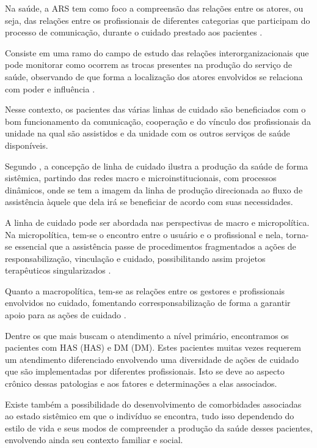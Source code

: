 Na saúde, a \acrlong{ARS} tem como foco a compreensão das relações entre os atores, ou seja, das relações entre os profissionais de diferentes categorias que participam do processo de comunicação, durante o cuidado prestado aos pacientes \cite{antonio2013}.
 
Consiste em uma ramo do campo de estudo das relações interorganizacionais que pode monitorar como ocorrem as trocas presentes na produção do serviço de saúde, observando de que forma a localização dos atores envolvidos se relaciona com poder e influência \cite{bittencourt2009rede}.

Nesse contexto, os pacientes das várias linhas de cuidado são beneficiados com o bom funcionamento da comunicação, cooperação e do vínculo dos profissionais da unidade na qual são assistidos e da unidade com os outros serviços de saúde disponíveis. 

Segundo , a concepção de linha de cuidado ilustra a produção da saúde de forma sistêmica, partindo das redes macro e microinstitucionais, com processos dinâmicos, onde se tem a imagem da linha de produção direcionada ao fluxo de assistência àquele que dela irá se beneficiar de acordo com suas necessidades.

A linha de cuidado pode ser abordada nas perspectivas de macro e micropolítica. Na micropolítica, tem-se o encontro entre o usuário e o profissional e nela, torna-se essencial que a assistência passe de procedimentos fragmentados a ações de responsabilização, vinculação e cuidado, possibilitando assim projetos terapêuticos singularizados \cite{malta2010percurso}.

Quanto a macropolítica, tem-se as relações entre os gestores e profissionais envolvidos no cuidado, fomentando corresponsabilização de forma a garantir apoio para as ações de cuidado \cite{malta2010percurso}.

Dentre os que mais buscam o atendimento a nível primário, encontramos os pacientes com \acrlong{HAS} (\acrshort{HAS}) e \acrlong{DM} (\acrshort{DM}). Estes pacientes muitas vezes requerem um atendimento diferenciado envolvendo uma diversidade de ações de cuidado que são implementadas por diferentes profissionais. Isto se deve ao aspecto crônico dessas patologias e aos fatores e determinações  a elas associados. 

Existe também a possibilidade do desenvolvimento de comorbidades associadas ao estado sistêmico em que o indivíduo se encontra, tudo isso dependendo do estilo de vida e seus modos de compreender a produção da saúde desses pacientes, envolvendo ainda seu contexto familiar e social. 

